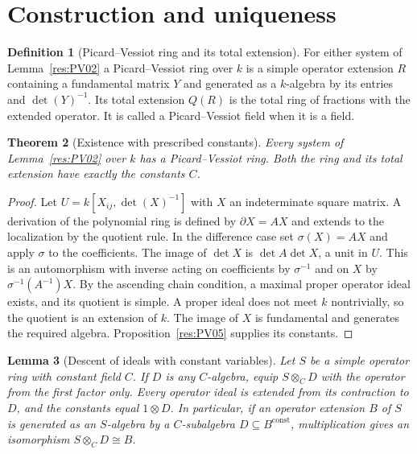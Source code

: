 \documentclass[11pt,oneside,openany]{book}
\newtheorem{theorem}{Theorem}[chapter]
\newtheorem{lemma}[theorem]{Lemma}
\theoremstyle{definition}
\newtheorem{definition}[theorem]{Definition}
\theoremstyle{remark}
\begin{document}
\section{Construction and uniqueness}

\begin{definition}[Picard--Vessiot ring and its total extension]
\label{res:PV06}
For either system of Lemma~\ref{res:PV02} a Picard--Vessiot ring
over \(k\) is a simple operator extension \(R\) containing a
fundamental matrix \(Y\) and generated as a \(k\)-algebra by its
entries and \(\det(Y)^{-1}\). Its total extension \(Q(R)\) is the
total ring of fractions with the extended operator. It is called a
Picard--Vessiot field when it is a field.
\end{definition}

\begin{theorem}[Existence with prescribed constants]
\label{res:PV07}
Every system of Lemma~\ref{res:PV02} over \(k\) has a
Picard--Vessiot ring. Both the ring and its total extension have
exactly the constants \(C\).
\end{theorem}

\begin{proof}
Let \(U=k[X_{ij},\det(X)^{-1}]\) with \(X\) an indeterminate
square matrix. A derivation of the polynomial ring is defined by
\(\partial X=AX\) and extends to the localization by the
quotient rule. In the difference case set \(\sigma(X)=AX\) and
apply \(\sigma\) to the coefficients. The image of \(\det X\) is
\(\det A\det X\), a unit in \(U\). This is an automorphism
with inverse acting on coefficients by \(\sigma^{-1}\) and on \(X\)
by \(\sigma^{-1}(A^{-1})X\).
By the ascending chain condition, a maximal proper operator
ideal exists, and its quotient is simple. A proper ideal does
not meet \(k\) nontrivially, so the quotient is an extension
of \(k\). The image of \(X\) is fundamental and generates the
required algebra. Proposition~\ref{res:PV05} supplies its constants.
\end{proof}

\begin{lemma}[Descent of ideals with constant variables]
\label{res:PV08}
Let \(S\) be a simple operator ring with constant field \(C\).
If \(D\) is any \(C\)-algebra, equip \(S\otimes_C D\) with the
operator from the first factor only. Every operator ideal is extended
from its contraction to \(D\), and the constants equal \(1\otimes D\).
In particular, if an operator extension \(B\) of \(S\) is generated
as an \(S\)-algebra by a \(C\)-subalgebra \(D\subseteq
B^{\mathrm{const}}\), multiplication gives an isomorphism
\(S\otimes_C D\cong B\).
\end{lemma}
\end{document}
